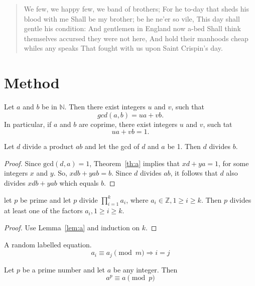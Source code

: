 \documentclass[
draft
]{sta-thesis}
\begin{document}
\begin{quote}
We few, we happy few, we band of brothers;
For he to-day that sheds his blood with me
Shall be my brother; be he ne'er so vile,
This day shall gentle his condition:
And gentlemen in England now a-bed
Shall think themselves accursed they were not here,
And hold their manhoods cheap whiles any speaks
That fought with us upon Saint Crispin's day.
\end{quote}

\lipsum
\chapter{Method}

\lipsum

\begin{theorem}\label{th:a}
Let $a$ and $b$ be in $\mathbb{N}$. Then there exist integers $u$ and $v$, such that
\[
gcd(a,b) = ua+vb.
\]
In particular, if $a$ and $b$ are coprime, there exist integers $u$ and $v$, such tat
\[
ua+vb=1.
\]
\end{theorem}

\begin{lemma}\label{lem:a}
Let $d$ divide a product $ab$ and let the gcd of $d$ and $a$ be 1. Then $d$ divides $b$.
\end{lemma}

\begin{proof}
Since $\mathrm{gcd}(d,a)=1$, Theorem~\ref{th:a} implies that $xd + ya = 1$, for some integers $x$ and $y$.
So, $xdb + yab = b$. Since $d$ divides $ab$, it follows that $d$ also divides $xdb + yab$ which equals $b$.
\end{proof}

\begin{corollary}
let $p$ be prime and let $p$ divide $\prod_{i=1}^{k}a_{i}$, where $a_{i}\in\mathbb{Z}, 1\geq i\geq k$. Then $p$ divides at least one of the factors $a_{i}, 1\geq i\geq k$.
\end{corollary}

\begin{proof}
Use Lemma~\ref{lem:a} and induction on $k$.
\end{proof}

\noindent
A random labelled equation.
\begin{equation}\label{eq:a}
a_{i}\equiv a_{j} \pmod{m}\Rightarrow i=j
\end{equation}

\begin{theorem}
Let $p$ be a prime number and let $a$ be any integer. Then
\[
a^{p}\equiv a\pmod{p}
\]
\end{theorem}
\end{document}
